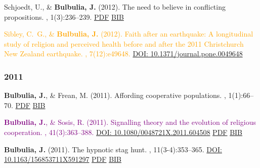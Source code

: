\documentclass{article}
\begin{document}
\begin{thebibliography}{99}
Schjoedt, U., \& {\bf Bulbulia, J.} (2012).
\newblock The need to believe in conflicting propositions.
, 1(3):236--239.
\href{http://www.tandfonline.com/doi/abs/10.1080/2153599X.2011.647857}{PDF} \href{https://www.dropbox.com/s/trju867snuho33k/needtobelieve.bib?dl=0}{BIB}


\textcolor{Orange}{Sibley, C.~G., \& {\bf Bulbulia, J.} (2012).
\newblock Faith after an earthquake: A longitudinal study of religion and
  perceived health before and after the 2011 {C}hristchurch {N}ew {Z}ealand
  earthquake.
, 7(12):e49648.\newblock 
\href{https://doi.org/10.1371/journal.pone.0049648}{DOI: 10.1371/journal.pone.0049648}}



\subsubsection*{2011} 



{\bf Bulbulia, J.}, \& Frean, M. (2011).
\newblock Affording cooperative populations.
, 1(1):66--70. \href{https://www.dropbox.com/s/2zksrbyav9agt14/BULBULIA_AFFORDING_2011.pdf?dl=0}{PDF} \href{https://www.dropbox.com/s/nkk7yepibk3f696/tandf_rrbb201_66.bib?dl=0}{BIB}


\textcolor{Purple}{
{\bf Bulbulia, J.}, \& Sosis, R. (2011).
\newblock Signalling theory and the evolution of religious cooperation.
, 41(3):363--388. 
\href{https://doi.org/10.1080/0048721X.2011.604508}{DOI: 10.1080/0048721X.2011.604508}}
\newblock \href{https://www.dropbox.com/s/j0zb0a74ut3j93r/Bulbulia_Sosis_Signalling_2011.pdf}{PDF} \href{https://www.dropbox.com/s/yxcfyzqa8d342em/sig.theory.bul.sos.bib?dl=0}{BIB}


{\bf Bulbulia, J.} (2011).
\newblock The hypnotic stag hunt.
, 11(3-4):353--365. 
\href{https://doi.org/10.1163/156853711X591297}{DOI: 10.1163/156853711X591297}
 \href{https://www.dropbox.com/s/ngdi2ldwnny7sd8/JOCC_011_03-04_06-Bulbulia.pdf}{PDF} \href{https://www.dropbox.com/s/o5lkyk8uvsuytn1/Hypnotic.bib?dl=0}{BIB}



\end{thebibliography}
\end{document}
